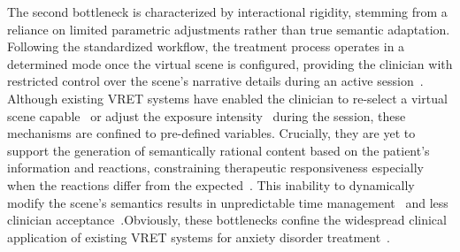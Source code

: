 \documentclass[]{interact}
\begin{document}

The second bottleneck is characterized by interactional rigidity, stemming from a reliance on limited parametric adjustments rather than true semantic adaptation. Following the standardized workflow, the treatment process operates in a determined mode once the virtual scene is configured, providing the clinician with restricted control over the scene's narrative details during an active session~\cite{boeldt2019using, bawany2023design}. Although existing VRET systems have enabled the clinician to re-select a virtual scene capable~\cite{marques2024gamified} or adjust the exposure intensity~\cite{zelis2025adaptive} during the session, these mechanisms are confined to pre-defined variables. Crucially, they are yet to support the generation of semantically rational content based on the patient's information and reactions, constraining therapeutic responsiveness especially when the reactions differ from the expected~\cite{freeman2017virtual}. This inability to dynamically modify the scene's semantics results in unpredictable time management~\cite{pittig2019struggle} and less clinician acceptance~\cite{jeon2025why}.Obviously, these bottlenecks confine the widespread clinical application of existing VRET systems for anxiety disorder treatment~\cite{boeldt2019using, emmelkamp2021virtual}.
\end{document}
